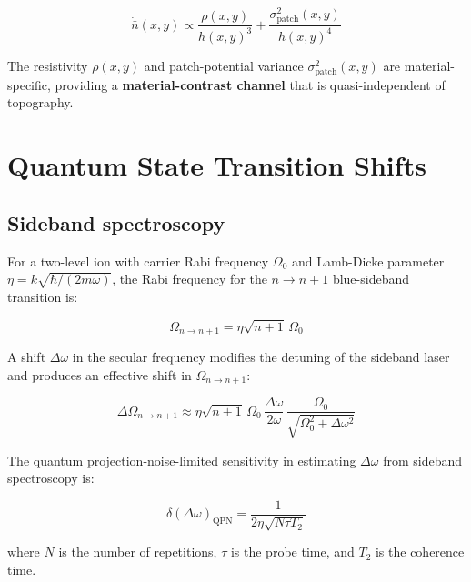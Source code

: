 \documentclass[11pt,a4paper]{article}
\begin{document}
\begin{equation}
\dot{\bar{n}}(x,y) \propto \frac{\rho(x,y)}{h(x,y)^3}
    + \frac{\sigma_{\text{patch}}^2(x,y)}{h(x,y)^4}
\label{eq:heating_contrast}
\end{equation}

The resistivity $\rho(x,y)$ and patch-potential variance
$\sigma_{\text{patch}}^2(x,y)$ are material-specific, providing a
\textbf{material-contrast channel} that is quasi-independent of topography.

\section{Quantum State Transition Shifts}

\subsection{Sideband spectroscopy}

For a two-level ion with carrier Rabi frequency $\Omega_0$ and Lamb-Dicke
parameter $\eta = k\sqrt{\hbar/(2m\omega)}$, the Rabi frequency for the
$n \to n+1$ blue-sideband transition is:

\begin{equation}
\Omega_{n\to n+1} = \eta\sqrt{n+1}\,\Omega_0
\label{eq:sideband_rabi}
\end{equation}

A shift $\Delta\omega$ in the secular frequency modifies the detuning of the
sideband laser and produces an effective shift in $\Omega_{n\to n+1}$:

\begin{equation}
\Delta\Omega_{n\to n+1} \approx \eta\sqrt{n+1}\,\Omega_0\,
    \frac{\Delta\omega}{2\omega}\,\frac{\Omega_0}{\sqrt{\Omega_0^2 + \Delta\omega^2}}
\label{eq:sideband_shift}
\end{equation}

The quantum projection-noise-limited sensitivity in estimating $\Delta\omega$
from sideband spectroscopy is:

\begin{equation}
\delta(\Delta\omega)_{\text{QPN}} = \frac{1}{2\eta\sqrt{N\tau T_2}}
\label{eq:qpn_sensitivity}
\end{equation}

where $N$ is the number of repetitions, $\tau$ is the probe time, and $T_2$
is the coherence time.
\end{document}
